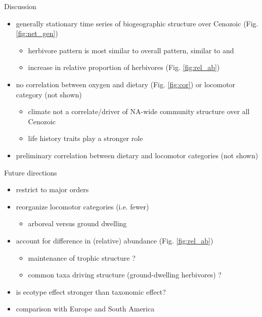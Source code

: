 \documentclass[final]{beamer}\usepackage[]{graphicx}\usepackage[]{color}
\newlength{\onecolwid}
\begin{document}
\begin{frame}[t]
\begin{columns}[t]
    \begin{columns}[t,totalwidth = \onecolwid]
      \begin{column}{\onecolwid}
        \begin{block}{Discussion}
          \begin{itemize}
            \item generally stationary time series of biogeographic structure over Cenozoic (Fig. \ref{fig:net_gen})
            \begin{itemize}
              \item herbivore pattern is most similar to overall pattern, similar to \citet{Jernvall2002} and \citet{Jernvall2004}
              \item increase in relative proportion of herbivores (Fig. \ref{fig:rel_ab})
            \end{itemize}
            \item no correlation between oxygen and dietary (Fig. \ref{fig:cor}) or locomotor category (not shown)
              \begin{itemize}
                \item climate not a correlate/driver of NA-wide community structure over all Cenozoic
                \item life history traits play a stronger role
              \end{itemize}
            \item preliminary correlation between dietary and locomotor categories (not shown)
          \end{itemize}
        \end{block}

        \begin{block}{Future directions}
          \begin{itemize}
            \item restrict to major orders \citep{Jernvall2004}
            \item reorganize locomotor categories (i.e. fewer)
            \begin{itemize}
              \item arboreal versus ground dwelling
            \end{itemize}
            \item account for difference in (relative) abundance (Fig. \ref{fig:rel_ab})
            \begin{itemize}
              \item maintenance of trophic structure \citep{Jernvall2004}?
              \item common taxa driving structure (ground-dwelling herbivores) \citep{Jernvall2002}?
            \end{itemize}
            \item is ecotype effect stronger than taxonomic effect?
            \item comparison with Europe and South America
          \end{itemize}
        \end{block}



\end{column}
\end{columns}
\end{columns}
\end{frame}
\end{document}
